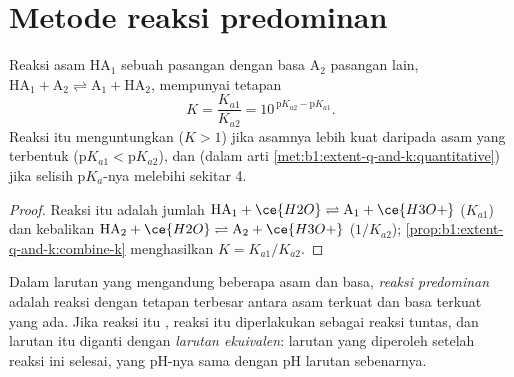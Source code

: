 \section{Metode reaksi predominan}

\begin{proposition}\label{prop:b1:predominant-reaction:k-of-reaction}
Reaksi asam $\mathrm{HA}_1$ sebuah pasangan dengan basa $\mathrm{A}_2$
pasangan lain,
$\mathrm{HA}_1 + \mathrm{A}_2 \rightleftharpoons \mathrm{A}_1 + \mathrm{HA}_2$,
mempunyai tetapan
\[
  K = \frac{K_{a1}}{K_{a2}} = 10^{\,\mathrm{p}K_{a2} - \mathrm{p}K_{a1}} .
\]
Reaksi itu menguntungkan ($K > 1$) jika asamnya lebih kuat daripada asam
yang terbentuk ($\mathrm{p}K_{a1} < \mathrm{p}K_{a2}$), dan 
(dalam arti \cref{met:b1:extent-q-and-k:quantitative}) jika selisih
$\mathrm{p}K_a$-nya melebihi sekitar 4.
\end{proposition}

\begin{proof}
Reaksi itu adalah jumlah $\mathrm{HA}_1 + \ce{H2O} \rightleftharpoons
\mathrm{A}_1 + \ce{H3O+}$ ($K_{a1}$) dan kebalikan $\mathrm{HA}_2 +
\ce{H2O} \rightleftharpoons \mathrm{A}_2 + \ce{H3O+}$ ($1/K_{a2}$);
\cref{prop:b1:extent-q-and-k:combine-k} menghasilkan $K = K_{a1}/K_{a2}$.
\end{proof}

\begin{definition}\label{def:b1:predominant-reaction:predominant-reaction}
Dalam larutan yang mengandung beberapa asam dan basa, \emph{reaksi
predominan} adalah reaksi dengan tetapan
terbesar antara asam terkuat dan basa terkuat yang ada. Jika reaksi itu
, reaksi itu diperlakukan sebagai reaksi tuntas, dan larutan
itu diganti dengan \emph{larutan ekuivalen}:
larutan yang diperoleh setelah reaksi ini selesai, yang pH-nya sama
dengan pH larutan sebenarnya.
\end{definition}


